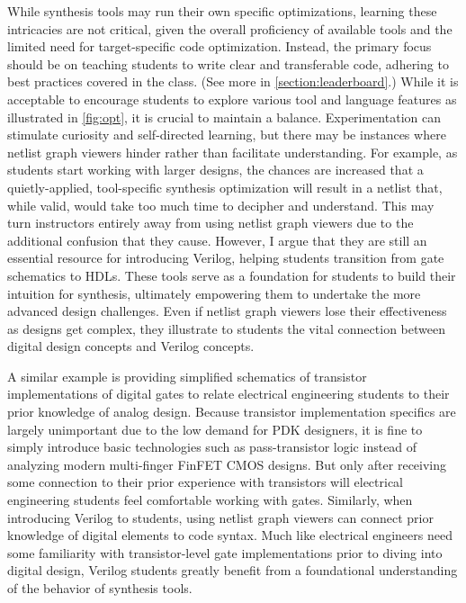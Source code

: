 While synthesis tools may run their own specific optimizations, learning these intricacies are not critical, given the overall proficiency of available tools and the limited need for target-specific code optimization. Instead, the primary focus should be on teaching students to write clear and transferable code, adhering to best practices covered in the class. (See more in \autoref{section:leaderboard}.) While it is acceptable to encourage students to explore various tool and language features as illustrated in \autoref{fig:opt}, it is crucial to maintain a balance. Experimentation can stimulate curiosity and self-directed learning, but there may be instances where netlist graph viewers hinder rather than facilitate understanding. For example, as students start working with larger designs, the chances are increased that a quietly-applied, tool-specific synthesis optimization will result in a netlist that, while valid, would take too much time to decipher and understand. This may turn instructors entirely away from using netlist graph viewers due to the additional confusion that they cause. However, I argue that they are still an essential resource for introducing Verilog, helping students transition from gate schematics to HDLs. These tools serve as a foundation for students to build their intuition for synthesis, ultimately empowering them to undertake the more advanced design challenges. Even if netlist graph viewers lose their effectiveness as designs get complex, they illustrate to students the vital connection between digital design concepts and Verilog concepts.

A similar example is providing simplified schematics of transistor implementations of digital gates to relate electrical engineering students to their prior knowledge of analog design. Because transistor implementation specifics are largely unimportant due to the low demand for PDK designers, it is fine to simply introduce basic technologies such as pass-transistor logic instead of analyzing modern multi-finger FinFET CMOS designs. But only after receiving some connection to their prior experience with transistors will electrical engineering students feel comfortable working with gates. Similarly, when introducing Verilog to students, using netlist graph viewers can connect prior knowledge of digital elements to code syntax. Much like electrical engineers need some familiarity with transistor-level gate implementations prior to diving into digital design, Verilog students greatly benefit from a foundational understanding of the behavior of synthesis tools.

